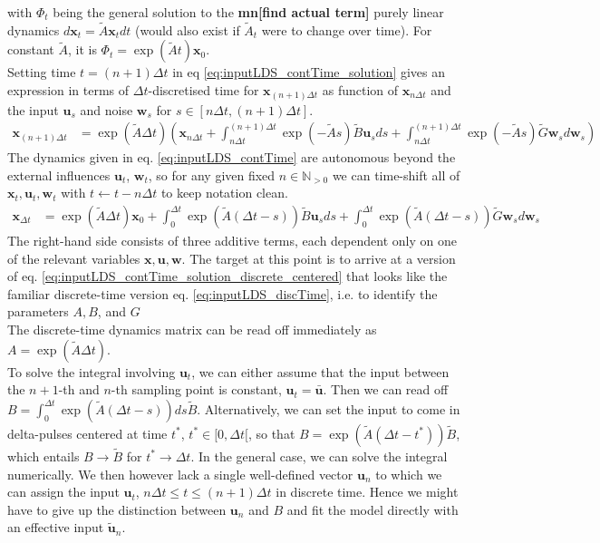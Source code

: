 \documentclass[10pt,letterpaper]{article}
\newcommand{\mn}[1]{   {\bf \color{blue}mn[#1]}  }
\newcommand{\xb}{\mathbf{x}}
\newcommand{\ub}{\mathbf{u}}
\newcommand{\wb}{\mathbf{w}}
\begin{document}
with $\Phi_t$ being the general solution to the \mn{find actual term} purely linear dynamics $d\xb_t = \tilde{A} \xb_t dt$ (would also exist if $\tilde{A}_t$ were to change over time). For constant $\tilde{A}$, it is $\Phi_t = \exp(\tilde{A} t) \xb_0$. \\
Setting time $t =(n+1)\Delta{}t$ in eq \ref{eq:inputLDS_contTime_solution} gives an expression in terms of $\Delta{}t$-discretised time for $\xb_{(n+1)\Delta{}t}$ as function of $\xb_{n\Delta{}t}$ and the input $\ub_s$ and noise $\wb_s$ for $s \in [n\Delta{}t, (n+1)\Delta{}t]$. 
\begin{align}
\xb_{(n+1)\Delta{}t} &= \exp(\tilde{A}\Delta{}t) \left( \xb_{n\Delta{}t} + \int_{n\Delta{}t}^{(n+1)\Delta{}t} \exp(-\tilde{A}s) \tilde{B} \ub_s ds + \int_{n\Delta{}t}^{(n+1)\Delta{}t} \exp(-\tilde{A}s) \tilde{G} \wb_s d\wb_s \right)
 \label{eq:inputLDS_contTime_solution_discrete} 
\end{align}
The dynamics given in eq. \ref{eq:inputLDS_contTime} are autonomous beyond the external influences $\ub_t$, $\wb_t$, so for any given fixed $n \in \mathbb{N}_{>0}$ we can time-shift all of $\xb_t, \ub_t, \wb_t$ with $t \leftarrow t - n \Delta{}t$ to keep notation clean. 
\begin{align}
\xb_{\Delta{}t} &= \exp(\tilde{A}\Delta{}t) \xb_{0} + \int_{0}^{\Delta{}t} \exp(\tilde{A}(\Delta{}t -s)) \tilde{B} \ub_s ds + \int_{0}^{\Delta{}t} \exp(\tilde{A}(\Delta{}t -s)) \tilde{G} \wb_s d\wb_s 
\label{eq:inputLDS_contTime_solution_discrete_centered} 
\end{align}
\noindent{}The right-hand side consists of three additive terms, each dependent only on one of the relevant variables $\xb, \ub, \wb$. The target at this point is to arrive at a version of eq. \ref{eq:inputLDS_contTime_solution_discrete_centered} that looks like the familiar discrete-time version eq. \ref{eq:inputLDS_discTime}, i.e. to identify the parameters $A, B$, and $G$ \\
\noindent{}The discrete-time dynamics matrix can be read off immediately as $A = \exp(\tilde{A}\Delta{}t)$. \\ 
\noindent{}To solve the integral involving $\ub_t$, we can either assume that the input between the $n+1$-th and $n$-th sampling point is constant, $\ub_t = \bar{\ub}$. Then we can read off $B = \int_0^{\Delta{}t} \exp(\tilde{A}(\Delta{}t - s)) ds \tilde{B}$. Alternatively, we can set the input to come in delta-pulses centered at time $t^*$, $t^* \in [0, \Delta{}t[$, so that $B = \exp(\tilde{A}(\Delta{}t-t^*))\tilde{B}$, which entails $B \rightarrow \tilde{B}$ for $t^* \rightarrow \Delta{}t$. In the general case, we can solve the integral numerically. We then however lack a single well-defined vector $\ub_n$ to which we can assign the input $\ub_t$, $n\Delta{}t \leq t \leq (n+1)\Delta{}t$ in discrete time. Hence we might have to give up the distinction between $\ub_n$ and $B$ and fit the model directly with an effective input $\tilde{\ub}_n$. \\
\end{document}
